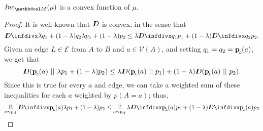 \begin{lemma}
	\label{thm:inc-convex}
	$\Inc_{\dg M}( \mu)$ is a convex function of $\mu$.
\end{lemma}
\begin{proof}
	It is well-known that $I\mkern-8muD$ is convex, in the sense that 
	\[ \kldiv{\lambda q_1 + (1-\lambda) q_2 }{ \lambda p_1
			  + (1-\lambda) p_2} \leq \lambda \kldiv {q_1}{ p_1} +
							(1-\lambda) \kldiv{q_2}{p_2}. \] 
Given an edge $L \in \mathcal E$ from $A$ to $B$ and $a \in \mathcal V(A)$,
and   
setting $q_1 = q_2 = \mathbf{p}_{\!_{L}\!}(a)$, we get that
	\[ \thickD(\bp(a) \ ||\ \lambda p_1 + (1-\lambda) p_2)
			\leq \lambda \thickD (\bp(a) \ ||\ p_1) + (1-\lambda)
							\thickD(\bp(a)\ ||\ p_2). \] 
	Since this is true for every $a$ and edge, we can take
		   a weighted sum of these inequalities for each $a$
		   weighted by $p(A=a)$; thus, 
	\begin{align*}
		\E_{a\sim p_A} \kldiv{\bp(a)}{\lambda p_1 +
			(1-\lambda) p_2} &\leq 
			 \E_{a\sim p_A}\lambda \kldiv {\bp(a)}{p_1} +
											(1-\lambda)
					 \kldiv{\bp(a)}{p_2} \\

\end{align*}
\end{proof}
